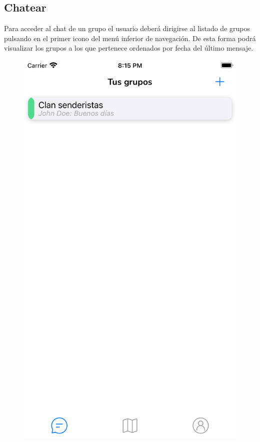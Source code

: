 \begin{appendices}
\section{Chatear}
Para acceder al chat de un grupo el usuario deberá dirigirse al listado de grupos pulsando en el primer icono del menú inferior de navegación.
De esta forma podrá visualizar los grupos a los que pertenece ordenados por fecha del último mensaje.
\begin{figure}[H]
        \centering
        \begin{minipage}{0.3\textwidth}
            \centering
            \includegraphics[cframe=black 2pt,width=1\linewidth]{images/manual/listadoGruposChats.png}

\end{minipage}
\end{figure}
\end{appendices}
